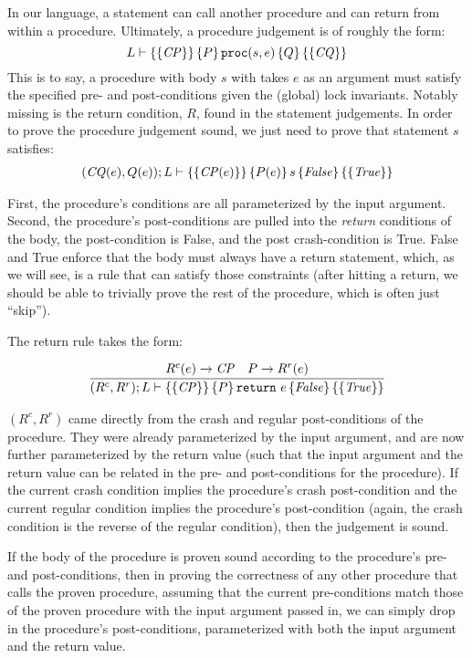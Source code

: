 In our language, a statement can call another procedure and can return from
within a procedure.
Ultimately, a procedure judgement is of roughly the form:
$$L \vdash \left\{\left\{ \mathit{CP} \right\}\right\} \left\{ P \right\} \texttt{proc}(s, e) \left\{ Q \right\} \left\{\left\{ \mathit{CQ} \right\}\right\}$$
This is to say, a procedure with body $s$ with takes $e$ as an argument must
satisfy the specified pre- and post-conditions given the (global) lock
invariants.
Notably missing is the return condition, $R$, found in the statement
judgements.
In order to prove the procedure judgement sound, we just need to
prove that statement $s$ satisfies:
\begin{gather*}
(\mathit{CQ}(e),Q(e)); L \vdash \left\{\left\{ \mathit{CP}(e) \right\}\right\} \left\{ P(e) \right\} s \left\{ \mathit{False} \right\} \left\{\left\{ \mathit{True} \right\}\right\}
\end{gather*}

First, the procedure's conditions are all parameterized by the input argument.
Second, the procedure's post-conditions are pulled into the \textit{return}
conditions of the body, the post-condition is False, and the post
crash-condition is True.
False and True enforce that the body must always have a
return statement, which, as we will see, is a rule that can satisfy those
constraints (after hitting a return, we should be able to trivially prove the
rest of the procedure, which is often just ``skip'').

The return rule takes the form:

\begin{gather*}
    \infer{\hoarestmt{(R^c,R^r)}{L}{\mathit{CP}}{P}{\texttt{return}~e}{\mathit{False}}{\mathit{True}}}
	  {R^c(e) \imp \mathit{CP} & P \imp R^r(e)}
\end{gather*}

$(R^c,R^r)$ came directly from the crash and regular post-conditions of the
procedure.
They were already parameterized by the input argument, and are now
further parameterized by the return value (such that the input argument and the
return value can be related in the pre- and post-conditions for the procedure).
If the current crash condition implies the procedure's crash post-condition and
the current regular condition implies the procedure's post-condition (again, the
crash condition is the reverse of the regular condition), then the judgement is
sound.

If the body of the procedure is proven sound according to the procedure's pre-
and post-conditions, then in proving the correctness of any other procedure that calls
the proven procedure, assuming that the current pre-conditions
match those of the proven procedure with the input argument passed in,
we can simply drop in the procedure's post-conditions, parameterized with both
the input argument and the return value.

